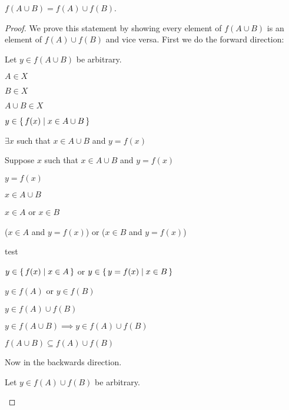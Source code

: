 \documentclass[../../main.tex]{subfiles}
\begin{document}
\begin{q}
\begin{enumerate}
        \item $f(A \cup B) = f(A) \cup f(B)$.
        \begin{proof}
            We prove this statement by showing every element of $f(A \cup B)$ is an element of $f(A) \cup f(B)$ and vice versa.
            First we do the forward direction:
            \begin{linebyline}
                \item Let $y \in f(A \cup B)$ be arbitrary.
                \item $A \in X$
                \item $B \in X$
                \item $A \cup B \in X$
                \item $y \in \{\,f(x)\mid x \in A \cup B\,\}$
                \item $\exists x$ such that $x \in A \cup B$ and $y=f(x)$
                \item Suppose $x$ such that $x \in A \cup B$ and $y=f(x)$
                \begin{linebyline}
                    \item $y = f(x)$
                    \item $x \in A \cup B$
                    \item $x \in A$ or $x \in B$
                    \item ($x \in A$ and $y=f(x)$) or ($x \in B$ and $y=f(x)$)
                    \begin{linebyline}
                        \item{test}
                    \end{linebyline}
                    \item $y \in \{\,f(x)\mid x \in A\,\}$ or $y \in \{\,y=f(x)\mid x \in B\,\}$
                    \item $y \in f(A)$ or $y \in f(B)$
                    \item $y \in f(A) \cup f(B)$
                \end{linebyline}
                \item $y \in f(A \cup B) \implies y \in f(A) \cup f(B)$
                \item $f(A \cup B) \subseteq f(A) \cup f(B)$
            \end{linebyline}
            Now in the backwards direction.
            \begin{linebyline}
                \item Let $y \in f(A) \cup f(B)$ be arbitrary.

\end{linebyline}
\end{proof}
\end{enumerate}
\end{q}
\end{document}
